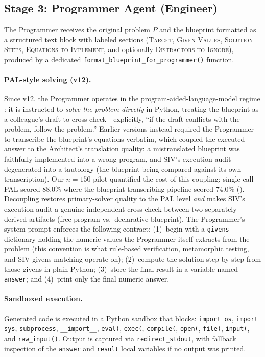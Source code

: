 \documentclass[11pt,a4paper]{article}
\begin{document}
\subsection{Stage 3: Programmer Agent (Engineer)}
\label{sec:programmer}
The Programmer receives the original problem $P$ and the blueprint formatted as a structured text block with labeled sections (\textsc{Target}, \textsc{Given Values}, \textsc{Solution Steps}, \textsc{Equations to Implement}, and optionally \textsc{Distractors to Ignore}), produced by a dedicated \texttt{format\_blueprint\_for\_programmer()} function.
\paragraph{PAL-style solving (v12).}
Since v12, the Programmer operates in the program-aided-language-model regime \citep{gao2023pal}: it is instructed to \emph{solve the problem directly} in Python, treating the blueprint as a colleague's draft to cross-check---explicitly, ``if the draft conflicts with the problem, follow the problem.''
Earlier versions instead required the Programmer to transcribe the blueprint's equations verbatim, which coupled the executed answer to the Architect's translation quality: a mistranslated blueprint was faithfully implemented into a wrong program, and SIV's execution audit degenerated into a tautology (the blueprint being compared against its own transcription).
Our $n{=}150$ pilot quantified the cost of this coupling: single-call PAL scored 88.0\% where the blueprint-transcribing pipeline scored 74.0\% ().
Decoupling restores primary-solver quality to the PAL level \emph{and} makes SIV's execution audit a genuine independent cross-check between two separately derived artifacts (free program vs.\ declarative blueprint).
The Programmer's system prompt enforces the following contract:
(1)~begin with a \texttt{givens} dictionary holding the numeric values the Programmer itself extracts from the problem (this convention is what rule-based verification, metamorphic testing, and SIV givens-matching operate on);
(2)~compute the solution step by step from those givens in plain Python;
(3)~store the final result in a variable named \texttt{answer}; and
(4)~print only the final numeric answer.
\paragraph{Sandboxed execution.}
Generated code is executed in a Python sandbox that blocks: \texttt{import os}, \texttt{import sys}, \texttt{subprocess}, \texttt{\_\_import\_\_}, \texttt{eval(}, \texttt{exec(}, \texttt{compile(}, \texttt{open(}, \texttt{file(}, \texttt{input(}, and \texttt{raw\_input()}.
Output is captured via \texttt{redirect\_stdout}, with fallback inspection of the \texttt{answer} and \texttt{result} local variables if no output was printed.
\end{document}
